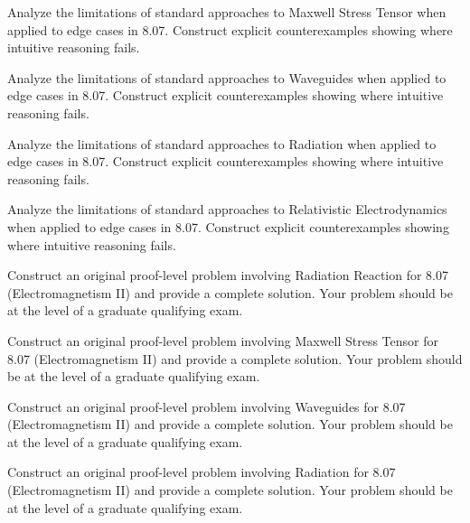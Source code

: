 \documentclass[12pt,a4paper]{exam}
\begin{document}
\begin{questions}
\vspace{0.3cm}

\question[3]
Analyze the limitations of standard approaches to Maxwell Stress Tensor when applied to edge cases in 8.07. Construct explicit counterexamples showing where intuitive reasoning fails.

\vspace{0.3cm}

\question[3]
Analyze the limitations of standard approaches to Waveguides when applied to edge cases in 8.07. Construct explicit counterexamples showing where intuitive reasoning fails.

\vspace{0.3cm}

\question[4]
Analyze the limitations of standard approaches to Radiation when applied to edge cases in 8.07. Construct explicit counterexamples showing where intuitive reasoning fails.

\vspace{0.3cm}

\question[5]
Analyze the limitations of standard approaches to Relativistic Electrodynamics when applied to edge cases in 8.07. Construct explicit counterexamples showing where intuitive reasoning fails.

\vspace{0.3cm}

\question[5]
Construct an original proof-level problem involving Radiation Reaction for 8.07 (Electromagnetism II) and provide a complete solution. Your problem should be at the level of a graduate qualifying exam.

\vspace{0.3cm}

\question[4]
Construct an original proof-level problem involving Maxwell Stress Tensor for 8.07 (Electromagnetism II) and provide a complete solution. Your problem should be at the level of a graduate qualifying exam.

\vspace{0.3cm}

\question[3]
Construct an original proof-level problem involving Waveguides for 8.07 (Electromagnetism II) and provide a complete solution. Your problem should be at the level of a graduate qualifying exam.

\vspace{0.3cm}

\question[2]
Construct an original proof-level problem involving Radiation for 8.07 (Electromagnetism II) and provide a complete solution. Your problem should be at the level of a graduate qualifying exam.


\end{questions}
\end{document}
